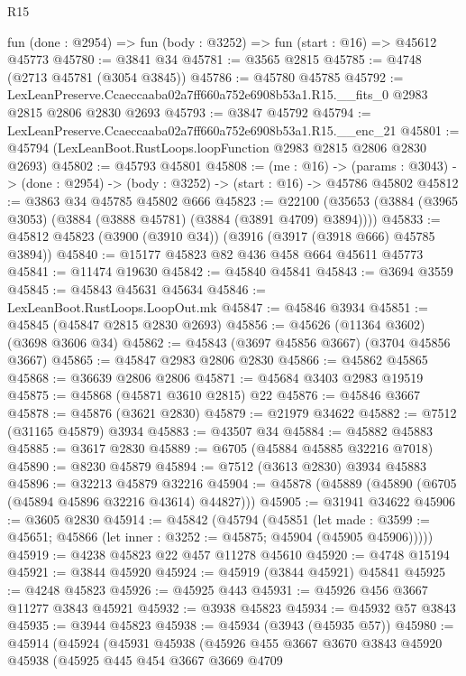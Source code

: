 \begin{lexlean}{R15}
\begin{coremodule}
  fun (done : @2954) => fun (body : @3252) => fun (start : @16) => @45612 @45773
@45780 := @3841 @34
@45781 := @3565 @2815
@45785 := @4748 (@2713 @45781 (@3054 @3845))
@45786 := @45780 @45785
@45792 := LexLeanPreserve.Ccaeccaaba02a7ff660a752e6908b53a1.R15.__fits_0
    @2983
    @2815
    @2806
    @2830
    @2693
@45793 := @3847 @45792
@45794 := LexLeanPreserve.Ccaeccaaba02a7ff660a752e6908b53a1.R15.__enc_21
@45801 := @45794 (LexLeanBoot.RustLoops.loopFunction @2983 @2815 @2806 @2830 @2693)
@45802 := @45793 @45801
@45808 := (me : @16) ->
  (params : @3043) -> (done : @2954) -> (body : @3252) -> (start : @16) -> @45786 @45802
@45812 := @3863 @34 @45785 @45802 @666
@45823 := @22100 (@35653 (@3884 (@3965 @3053) (@3884 (@3888 @45781) (@3884 (@3891 @4709) @3894))))
@45833 := @45812 @45823 (@3900 (@3910 @34)) (@3916 (@3917 (@3918 @666) @45785 @3894))
@45840 := @15177 @45823 @82 @436 @458 @664 @45611 @45773
@45841 := @11474 @19630
@45842 := @45840 @45841
@45843 := @3694 @3559
@45845 := @45843 @45631 @45634
@45846 := LexLeanBoot.RustLoops.LoopOut.mk
@45847 := @45846 @3934
@45851 := @45845 (@45847 @2815 @2830 @2693)
@45856 := @45626 (@11364 @3602) (@3698 @3606 @34)
@45862 := @45843 (@3697 @45856 @3667) (@3704 @45856 @3667)
@45865 := @45847 @2983 @2806 @2830
@45866 := @45862 @45865
@45868 := @36639 @2806 @2806
@45871 := @45684 @3403 @2983 @19519
@45875 := @45868 (@45871 @3610 @2815) @22
@45876 := @45846 @3667
@45878 := @45876 (@3621 @2830)
@45879 := @21979 @34622
@45882 := @7512 (@31165 @45879) @3934
@45883 := @43507 @34
@45884 := @45882 @45883
@45885 := @3617 @2830
@45889 := @6705 (@45884 @45885 @32216 @7018)
@45890 := @8230 @45879
@45894 := @7512 (@3613 @2830) @3934 @45883
@45896 := @32213 @45879 @32216
@45904 := @45878 (@45889 (@45890 (@6705 (@45894 @45896 @32216 @43614) @44827)))
@45905 := @31941 @34622
@45906 := @3605 @2830
@45914 := @45842
    (@45794
      (@45851
        (let made : @3599 := @45651; @45866 (let inner : @3252 := @45875; @45904 (@45905 @45906)))))
@45919 := @4238 @45823 @22 @457 @11278 @45610
@45920 := @4748 @15194
@45921 := @3844 @45920
@45924 := @45919 (@3844 @45921) @45841
@45925 := @4248 @45823
@45926 := @45925 @443
@45931 := @45926 @456 @3667 @11277 @3843 @45921
@45932 := @3938 @45823
@45934 := @45932 @57 @3843
@45935 := @3944 @45823
@45938 := @45934 (@3943 (@45935 @57))
@45980 := @45914
    (@45924
      (@45931
        @45938
        (@45926
          @455
          @3667
          @3670
          @3843
          @45920
          @45938
          (@45925
            @445
            @454
            @3667
            @3669
            @4709

\end{coremodule}
\end{lexlean}
